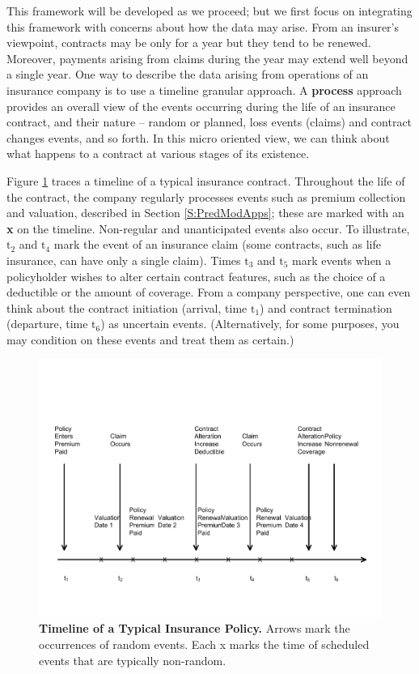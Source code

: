 \documentclass[
]{book}
\begin{document}
This framework will be developed as we proceed; but we first focus on
integrating this framework with concerns about how the data may arise. From an insurer's viewpoint, contracts may be only for a year but they tend to be renewed. Moreover, payments arising from claims during the year may extend well beyond a single year. One way to describe the data arising from operations of an insurance company is to use a timeline granular approach. A \textbf{process} approach provides an overall view of the events occurring during the life of an insurance contract, and their nature -- random or planned, loss events (claims) and contract changes events, and so forth. In this
micro oriented view, we can think about what happens to a
contract at various stages of its existence.

Figure \ref{fig:StochOperations} traces a timeline of a typical insurance contract. Throughout the life of the contract, the company regularly processes events such as premium collection and valuation, described in Section \ref{S:PredModApps}; these are marked with an \textbf{x} on the timeline. Non-regular and unanticipated events also occur. To illustrate, \(\mathrm{t}_2\) and \(\mathrm{t}_4\) mark the event of an insurance claim (some contracts, such as life insurance, can have only a single claim). Times \(\mathrm{t}_3\) and \(\mathrm{t}_5\) mark events when a policyholder wishes to alter certain contract
features, such as the choice of a deductible or the amount of coverage. From a company perspective, one can even think about the
contract initiation (arrival, time \(\mathrm{t}_1\)) and contract termination (departure, time \(\mathrm{t}_6\)) as uncertain events. (Alternatively, for some purposes, you may condition on these events and treat them as certain.)



\begin{figure}

{\centering \includegraphics[width=1\linewidth]{LossDataAnalytics_files/figure-latex/StochOperations-1} 

}

\caption{\textbf{Timeline of a Typical Insurance Policy.} Arrows mark the occurrences of random events. Each x marks the time of scheduled events that are typically non-random.}\label{fig:StochOperations}
\end{figure}
\end{document}
